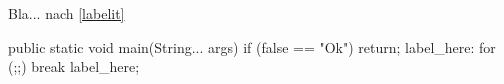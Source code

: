 
\begin{task}{5.5}
	Bla... nach \cref{labelit}

	\begin{javacode}
		public static void main(String... args) {
			if (false == "Ok") return;
			label_here:
			for (;;) break label_here;
		}
	\end{javacode}
\end{task}
